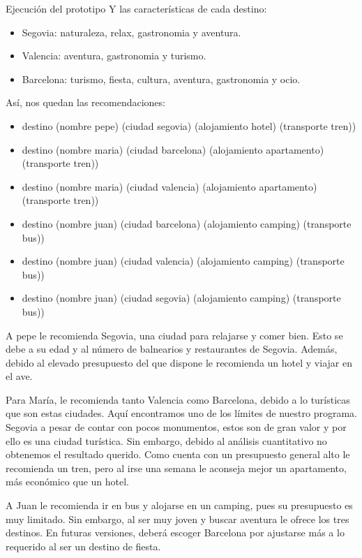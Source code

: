 \documentclass[11pt, a4paper, spanish, openright, twoside]{book}
\begin{document}
\begin{section}{Ejecución del prototipo}
 	Y las características de cada destino:
 	\begin{itemize}
			\item Segovia: naturaleza, relax, gastronomia y aventura.
			\item Valencia: aventura, gastronomia y turismo.
			\item Barcelona: turismo, fiesta, cultura, aventura, gastronomia y ocio.
	\end{itemize}
 	
	Así, nos quedan las recomendaciones:
	
		\begin{itemize}
			\item destino (nombre pepe) (ciudad segovia) (alojamiento hotel) (transporte tren))
			 \item destino (nombre maria) (ciudad barcelona) (alojamiento apartamento) (transporte tren))							 \item destino (nombre maria) (ciudad valencia) (alojamiento apartamento) (transporte tren))
			\item destino (nombre juan) (ciudad barcelona) (alojamiento camping) (transporte bus))			
			\item destino (nombre juan) (ciudad valencia) (alojamiento camping) (transporte bus))
			\item destino (nombre juan) (ciudad segovia) (alojamiento camping) (transporte bus))
	
	\end{itemize}
	
		A pepe le recomienda Segovia, una ciudad para relajarse y comer bien. Esto se debe a su edad y al número de balnearios y restaurantes de Segovia. Además, debido al elevado presupuesto del que dispone le recomienda un hotel y viajar en el ave.
		
		Para María, le recomienda tanto Valencia como Barcelona, debido a lo turísticas que son estas ciudades. Aquí encontramos uno de los límites de nuestro programa. Segovia a pesar de contar con pocos monumentos, estos son de gran valor y por ello es una ciudad turística. Sin embargo, debido al análisis cuantitativo no obtenemos el resultado querido. Como cuenta con un presupuesto general alto le recomienda un tren, pero al irse una semana le aconseja mejor un apartamento, más económico que un hotel.
		
		A Juan le recomienda ir en bus y alojarse en un camping, pues su presupuesto es muy limitado. Sin embargo, al ser muy joven y buscar aventura le ofrece los tres destinos. En futuras versiones, deberá escoger Barcelona por ajustarse más a lo requerido al ser un destino de fiesta.
		
		
		
		

	\end{section}
	
\end{document}
